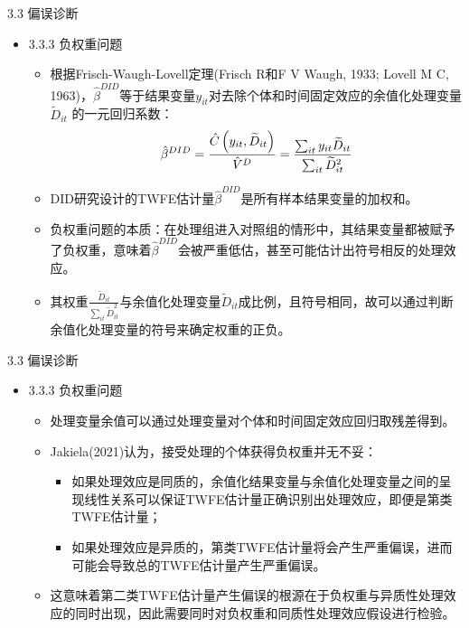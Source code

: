 \documentclass{beamer}%
\begin{document}
\begin{frame}[t]{\large 3.3 偏误诊断}
\begin{itemize}
  \item 3.3.3 负权重问题
  \begin{itemize}
  \item 根据Frisch-Waugh-Lovell定理(Frisch R和F V Waugh, 1933; Lovell M C, 1963)，$\hat{\beta}^{DID}$等于结果变量$y_{it}$对去除个体和时间固定效应的余值化处理变量 $\widetilde{D}_{it}$ 的一元回归系数：
    \begin{equation}
    \setlength{\abovedisplayskip}{1pt}
    \setlength{\belowdisplayskip}{1pt}
    \hat{\beta}^{DID}=\frac{\hat{C}\left(y_{i t}, \widetilde{D}_{i t}\right)}{\hat{V}^D}=\frac{\sum_{i t} y_{i t} \widetilde{D}_{i t}}{\sum_{i t} \widetilde{D}_{i t}^2}
    \end{equation}
  \item DID研究设计的TWFE估计量$\hat{\beta}^{DID}$是所有样本结果变量的加权和。
  \item 负权重问题的本质：在处理组进入对照组的情形中，其结果变量都被赋予了负权重，意味着$\hat{\beta}^{DID}$会被严重低估，甚至可能估计出符号相反的处理效应。
  \item 其权重$\frac{\widetilde{D}_{it}}{\sum_{it}\widetilde{D}_{i t}^2}$与余值化处理变量$\widetilde{D}_{it}$成比例，且符号相同，故可以通过判断余值化处理变量的符号来确定权重的正负。
  \end{itemize}
\end{itemize}
\end{frame}


\begin{frame}[t]{\large 3.3 偏误诊断}
\begin{itemize}
  \item 3.3.3 负权重问题
  \begin{itemize}
  \item 处理变量余值可以通过处理变量对个体和时间固定效应回归取残差得到。
  \item Jakiela(2021)认为，接受处理的个体获得负权重并无不妥：
  \begin{itemize}
  \item 如果处理效应是同质的，余值化结果变量与余值化处理变量之间的呈现线性关系可以保证TWFE估计量正确识别出处理效应，即便是第类TWFE估计量；
  \item 如果处理效应是异质的，第类TWFE估计量将会产生严重偏误，进而可能会导致总的TWFE估计量产生严重偏误。
  \end{itemize}
  \item 这意味着第二类TWFE估计量产生偏误的根源在于负权重与异质性处理效应的同时出现，因此需要同时对负权重和同质性处理效应假设进行检验。
  \end{itemize}
\end{itemize}
\end{frame}
\end{document}
